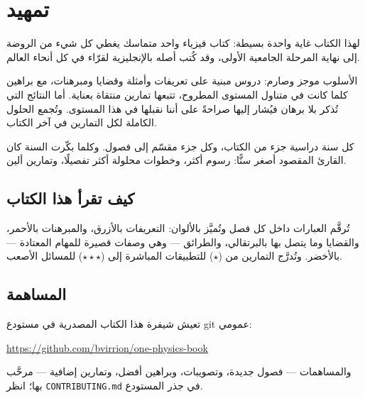 \chapter{تمهيد}

لهذا الكتاب غاية واحدة بسيطة: كتاب فيزياء واحد متماسك يغطي كل شيء من
الروضة إلى نهاية المرحلة الجامعية الأولى، وقد كُتب أصله بالإنجليزية
لقرّاء في كل أنحاء العالم.

الأسلوب موجز وصارم: دروس مبنية على تعريفات وأمثلة وقضايا ومبرهنات، مع
براهين كلما كانت في متناول المستوى المطروح، تتبعها تمارين منتقاة بعناية.
أما النتائج التي تُذكر بلا برهان فيُشار إليها صراحةً على أننا نقبلها في
هذا المستوى. وتُجمع الحلول الكاملة لكل التمارين في آخر الكتاب.

كل سنة دراسية جزء من الكتاب، وكل جزء مقسّم إلى فصول. وكلما بكّرت السنة
كان القارئ المقصود أصغر سنًّا: رسوم أكثر، وخطوات محلولة أكثر تفصيلًا،
وتمارين ألين.

\section*{كيف تقرأ هذا الكتاب}

تُرقَّم العبارات داخل كل فصل وتُميَّز بالألوان: التعريفات بالأزرق،
والمبرهنات بالأحمر، والقضايا وما يتصل بها بالبرتقالي، والطرائق --- وهي
وصفات قصيرة للمهام المعتادة --- بالأخضر. وتُدرَّج التمارين من ($\star$)
للتطبيقات المباشرة إلى ($\star\star\star$) للمسائل الأصعب.

\section*{المساهمة}

تعيش شيفرة هذا الكتاب المصدرية في مستودع git عمومي:
\begin{center}
\url{https://github.com/bvirrion/one-physics-book}
\end{center}
والمساهمات --- فصول جديدة، وتصويبات، وبراهين أفضل، وتمارين إضافية ---
مرحَّب بها؛ انظر \texttt{CONTRIBUTING.md} في جذر المستودع.
